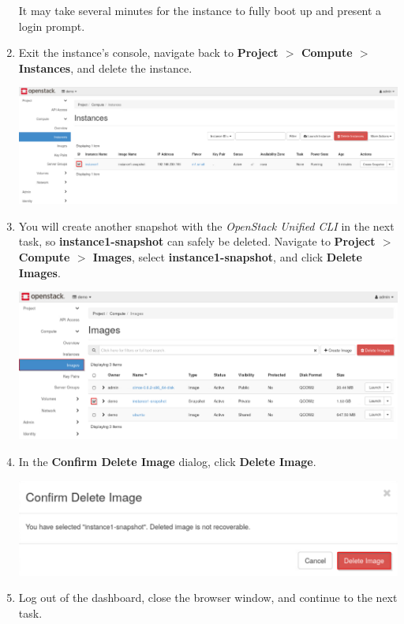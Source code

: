\documentclass[letterpaper, 12pt]{article}
\begin{document}
\begin{enumerate}
    \begin{notebox}
        It may take several minutes for the instance to fully boot up and present a login prompt.
    \end{notebox}

    \item Exit the instance's console, navigate back to \textbf{Project $>$ Compute $>$ Instances}, and delete the instance.

    \begin{center}
        \includegraphics[width=\linewidth]{images/part1/step19.png}
    \end{center}

    \item You will create another snapshot with the \textit{OpenStack Unified CLI} in the next task, so \textbf{instance1-snapshot} can safely be deleted.
    Navigate to \textbf{Project $>$ Compute $>$ Images}, select \textbf{instance1-snapshot}, and click \textbf{Delete Images}.

    \begin{center}
        \includegraphics[width=\linewidth]{images/part1/step20.png}
    \end{center}

    \item In the \textbf{Confirm Delete Image} dialog, click \textbf{Delete Image}.

    \begin{center}
        \includegraphics[width=\linewidth]{images/part1/step21.png}
    \end{center}

    \item Log out of the dashboard, close the browser window, and continue to the next task.
\end{enumerate}
\end{document}
